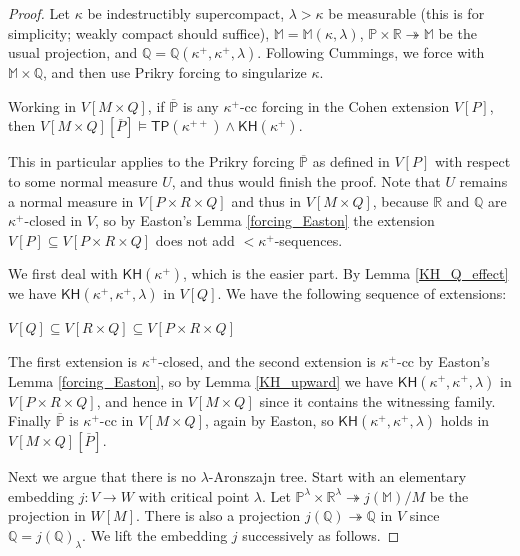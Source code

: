 \documentclass[10pt,a4paper]{amsart}
\begin{document}
\begin{proof}
Let $\kappa$ be indestructibly supercompact, $\lambda>\kappa$ be measurable (this is for simplicity; weakly compact should suffice), $\mathbb{M}=\mathbb{M}(\kappa,\lambda)$, $\mathbb{P}\times\mathbb{R}\twoheadrightarrow\mathbb{M}$ be the usual projection, and $\mathbb{Q}=\mathbb{Q}(\kappa^+,\kappa^+,\lambda)$. Following Cummings, we force with $\mathbb{M}\times\mathbb{Q}$, and then use Prikry forcing to singularize $\kappa$. 

\begin{claim}
Working in $V[M\times Q]$, if $\overline{\mathbb{P}}$ is any $\kappa^+$-cc forcing in the Cohen extension $V[P]$, then $V[M\times Q][\overline{P}]\models\mathsf{TP(\kappa^{++})\land\mathsf{KH}(\kappa^+)}$.
\end{claim}


This in particular applies to the Prikry forcing $\mathbb{\overline{P}}$ as defined in $V[P]$ with respect to some normal measure $U$, and thus would finish the proof. Note that $U$ remains a normal measure in $V[P\times R\times Q]$ and thus in $V[M\times Q]$, because $\mathbb{R}$ and $\mathbb{Q}$ are $\kappa^+$-closed in $V$, so by Easton's Lemma \ref{forcing_Easton} the extension $V[P]\subseteq V[P\times R\times Q]$ does not add $<\kappa^+$-sequences.

We first deal with $\mathsf{KH}(\kappa^+)$, which is the easier part. By Lemma \ref{KH_Q_effect} we have $\mathsf{KH}(\kappa^+,\kappa^+,\lambda)$ in $V[Q]$. We have the following sequence of extensions:

\begin{center}
$V[Q]\subseteq V[R\times Q]\subseteq V[P\times R\times Q]$
\end{center}

The first extension is $\kappa^+$-closed, and the second extension is $\kappa^+$-cc by Easton's Lemma \ref{forcing_Easton}, so by Lemma \ref{KH_upward} we have $\mathsf{KH}(\kappa^+,\kappa^+,\lambda)$ in $V[P\times R\times Q]$, and hence in $V[M\times Q]$ since it contains the witnessing family. Finally $\overline{\mathbb{P}}$ is $\kappa^+$-cc in $V[M\times Q]$, again by Easton, so $\mathsf{KH}(\kappa^+,\kappa^+,\lambda)$ holds in $V[M\times Q][\overline{P}]$.

Next we argue that there is no $\lambda$-Aronszajn tree. Start with an elementary embedding $j:V\rightarrow W$ with critical point $\lambda$. Let $\mathbb{P}^\lambda\times\mathbb{R}^\lambda\twoheadrightarrow j(\mathbb{M})/M$ be the projection in $W[M]$. There is also a projection $j(\mathbb{Q})\twoheadrightarrow\mathbb{Q}$ in $V$ since $\mathbb{Q}=j(\mathbb{Q})_\lambda$. We lift the embedding $j$ successively as follows.


\end{proof}
\end{document}

